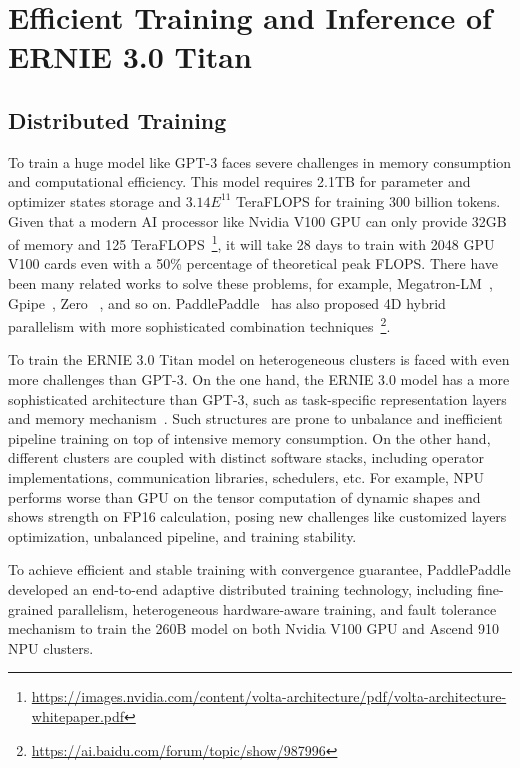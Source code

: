 \setcounter{secnumdepth}{4}
\section{Efficient Training and Inference of ERNIE 3.0 Titan} 

\subsection{Distributed Training} To train a huge model like GPT-3 faces severe challenges in memory consumption and computational efficiency. This model requires 2.1TB for parameter and optimizer states storage and $3.14E^{11}$ TeraFLOPS for training 300 billion tokens. Given that a modern AI processor like Nvidia V100 GPU can only provide 32GB of memory and 125 TeraFLOPS~\footnote{\url{https://images.nvidia.com/content/volta-architecture/pdf/volta-architecture-whitepaper.pdf}}, it will take 28 days to train with 2048 GPU V100 cards even with a 50\% percentage of theoretical peak FLOPS. There have been many related works to solve these problems, for example, Megatron-LM~\cite{megatron}, Gpipe~\cite{huangGPipeEfficientTraining2019}, Zero~\cite{rajbhandariZeROMemoryOptimizations2020} , and so on. PaddlePaddle~\cite{ma2019paddlepaddle} has also proposed 4D hybrid parallelism with more sophisticated combination techniques~\footnote{\url{https://ai.baidu.com/forum/topic/show/987996}}. 

To train the ERNIE 3.0 Titan model on heterogeneous clusters is faced with even more challenges than GPT-3. On the one hand, the ERNIE 3.0 model has a more sophisticated architecture than GPT-3, such as task-specific representation layers and memory mechanism~\cite{DBLP:journals/corr/abs-2012-15688}. Such structures are prone to unbalance and inefficient pipeline training on top of intensive memory consumption. On the other hand, different clusters are coupled with distinct software stacks, including operator implementations, communication libraries, schedulers, etc. For example, NPU performs worse than GPU on the tensor computation of dynamic shapes and shows strength on FP16 calculation, posing new challenges like customized layers optimization, unbalanced pipeline, and training stability.

To achieve efficient and stable training with convergence guarantee, PaddlePaddle developed an end-to-end adaptive distributed training technology, including fine-grained parallelism, heterogeneous hardware-aware training, and fault tolerance mechanism to train the 260B model on both Nvidia V100 GPU and Ascend 910 NPU clusters.

